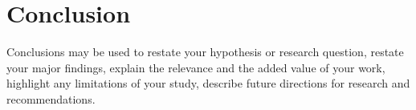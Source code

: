 \documentclass[sn-mathphys-num]{sn-jnl}%
\theoremstyle{thmstyleone}%
\theoremstyle{thmstyletwo}%
\theoremstyle{thmstylethree}%
\begin{document}
\begin{mathpar}


    

    
\end{mathpar}













\section{Conclusion}\label{sec13}

Conclusions may be used to restate your hypothesis or research question, restate your major findings, explain the relevance and the added value of your work, highlight any limitations of your study, describe future directions for research and recommendations. 
\end{document}
